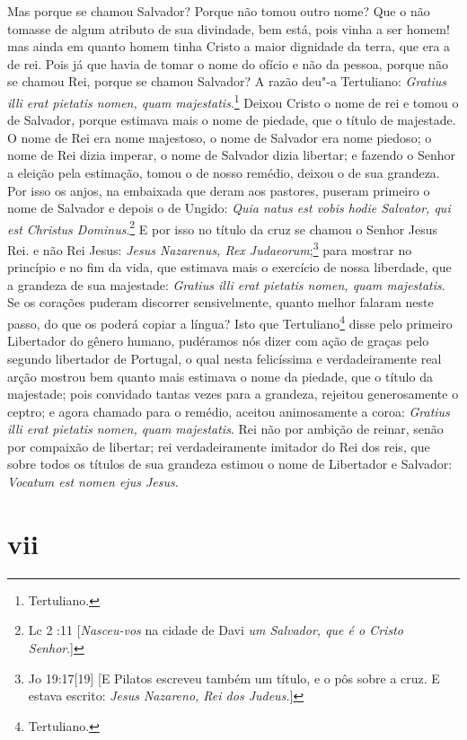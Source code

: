 Mas porque se chamou Salvador? Porque não tomou outro nome? Que o não
tomasse de algum atributo de sua divindade, bem está, pois vinha a ser
homem! mas ainda em quanto homem tinha Cristo a maior dignidade da
terra, que era a de rei. Pois já que havia de tomar o nome do ofício e
não da pessoa, porque não se chamou Rei, porque se chamou Salvador? A
razão deu"-a Tertuliano: \emph{Gratius illi erat pietatis nomen, quam
majestatis}.\footnote{Tertuliano.} Deixou Cristo o nome de rei e tomou o de Salvador, porque
estimava mais o nome de piedade, que o título de majestade. O nome de
Rei era nome majestoso, o nome de Salvador era nome piedoso; o nome de
Rei dizia imperar, o nome de Salvador dizia libertar; e fazendo o Senhor
a eleição pela estimação, tomou o de nosso remédio, deixou o de sua
grandeza. Por isso os anjos, na embaixada que deram aos pastores,
puseram primeiro o nome de Salvador e depois o de Ungido: \emph{Quia
natus est vobis hodie Salvator, qui est Christus Dominus}.\footnote{Lc 2 :11 [\textit{Nasceu-vos} na cidade de Davi \textit{um Salvador, que é o Cristo Senhor}.]} E por isso no
título da cruz se chamou o Senhor Jesus Rei. e não Rei Jesus:
\emph{Jesus Nazarenus, Rex Judaeorum};\footnote{Jo 19:17[19] [E Pilatos escreveu também um título, e o pôs sobre a cruz. E estava escrito: \textit{Jesus Nazareno, Rei dos Judeus.}]} para mostrar no princípio e no
fim da vida, que estimava mais o exercício de nossa liberdade, que a
grandeza de sua majestade: \emph{Gratius illi erat pietatis nomen, quam
majestatis}.
Se os corações puderam discorrer sensivelmente, quanto melhor falaram
neste passo, do que os poderá copiar a língua? Isto que Tertuliano\footnote{Tertuliano.} disse
pelo primeiro Libertador do gênero humano, pudéramos nós dizer com ação
de graças
pelo segundo libertador de Portugal, o qual nesta felicíssima e
verdadeiramente real arção mostrou bem quanto mais estimava o nome da
piedade, que o título da majestade; pois convidado tantas vezes para a
grandeza, rejeitou generosamente o ceptro; e agora chamado para o
remédio, aceitou animosamente a coroa: \emph{Gratius illi erat pietatis
nomen, quam majestatis}. Rei não por ambição de reinar, senão por
compaixão de libertar; rei verdadeiramente imitador do Rei dos reis, que
sobre todos os títulos de sua grandeza estimou o nome de Libertador e
Salvador: \emph{Vocatum est nomen ejus Jesus}.

\section*{vii}

